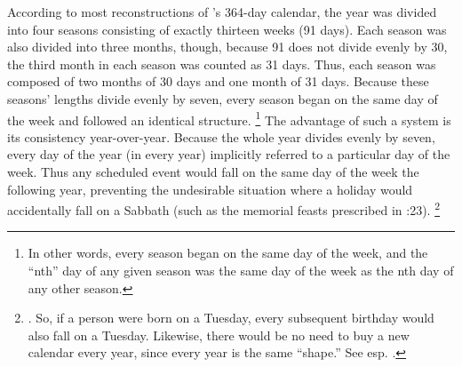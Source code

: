 According to most reconstructions of \jub's 364-day calendar, the year was divided into four seasons consisting of exactly thirteen weeks (91 days). Each season was also divided into three months, though, because 91 does not divide evenly by 30, the third month in each season was counted as 31 days. Thus, each season was composed of two months of 30 days and one month of 31 days. Because these seasons' lengths divide evenly by seven, every season began on the same day of the week and followed an identical structure.%
    \footnote{In other words, every season began on the same day of the week, and the ``nth'' day of any given season was the same day of the week as the nth day of any other season.}
The advantage of such a system is its consistency year-over-year. Because the whole year divides evenly by seven, every day of the year (in every year) implicitly referred to a particular day of the week. Thus any scheduled event would fall on the same day of the week the following year, preventing the undesirable situation where a holiday would accidentally fall on a Sabbath (such as the memorial feasts prescribed in :23).%
    \footnote{\Cite[233]{bergsma2007}. So, if a person were born on a Tuesday, every subsequent birthday would also fall on a Tuesday. Likewise, there would be no need to buy a new calendar every year, since every year is the same ``shape.'' See esp. \cite[253]{jaubert_vt1953}.}

